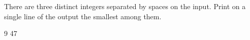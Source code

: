 




There are three distinct integers separated by spaces on the input. Print on a single line of the output the smallest among them.

 9 47
\koniec

